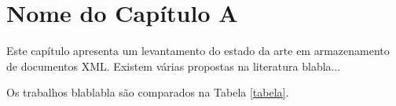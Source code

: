 \chapter{Nome do Capítulo A}

Este capítulo apresenta um levantamento do estado da arte em armazenamento de documentos XML. Existem várias propostas na literatura blabla...

\begin{table}
\caption{Comparação dos trabalhos\label{tabela}} %
\end{table}

Os trabalhos blablabla são comparados na Tabela \ref{tabela}. 
